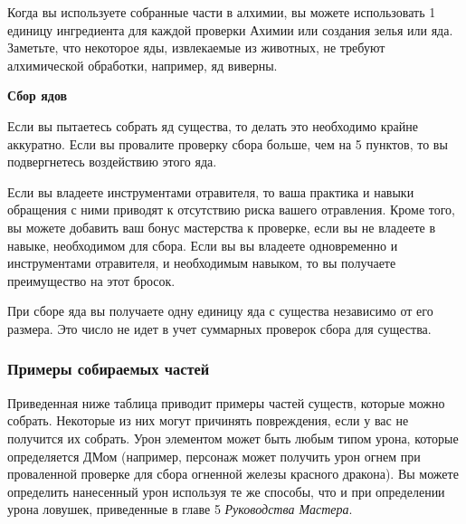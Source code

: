 \documentclass[a4paper, 9pt, twocolumn]{book}
\newenvironment {dndtable}
{
		\bigskip
		\centering
		\begin{tcolorbox}
			[enhanced, 
			sharp corners,
			colback=framecolor, 
			boxrule = 0pt, 
			overlay={
				\begin{tcbinvclipframe}
					\path[fill=black] ([xshift=10pt,yshift=7pt]frame.north west) --
					(frame.north west) --
					(frame.north east) --
					([xshift=-10pt, yshift=7pt]frame.north east) --
					([xshift=-10pt, yshift=2pt]frame.north east) --
					([xshift=10pt,yshift=2pt]frame.north west) -- cycle;
					
					\path[fill=black] ([xshift=10pt,yshift=-7pt]frame.south west) --
					(frame.south west) --
					(frame.south east) --
					([xshift=-10pt, yshift=-7pt]frame.south east) --
					([xshift=-10pt, yshift=-2pt]frame.south east) --
					([xshift=10pt,yshift=-2pt]frame.south west) -- cycle;
				\end{tcbinvclipframe}
			}
			]}
{\end{tcolorbox}}
\begin{document}
	Когда вы используете собранные части в алхимии, вы можете использовать 1 единицу ингредиента для каждой проверки Ахимии или создания зелья или яда. Заметьте, что некоторое яды, извлекаемые из животных, не требуют алхимической обработки, например, яд виверны.
	
	
	
	\begin{dndtable}
		
		{\Large \textbf{Сбор ядов}}
		
		Если вы пытаетесь собрать яд существа, то делать это необходимо крайне аккуратно. Если вы провалите проверку сбора больше, чем на 5 пунктов, то вы подвергнетесь воздействию этого яда.
		
		Если вы владеете инструментами отравителя, то ваша практика и навыки обращения с ними приводят к отсутствию риска вашего отравления. Кроме того, вы можете добавить ваш бонус мастерства к проверке, если вы не владеете в навыке, необходимом для сбора. Если вы вы владеете одновременно и инструментами отравителя, и необходимым навыком, то вы получаете преимущество на этот бросок.
		
		При сборе яда вы получаете одну единицу яда с существа независимо от его размера. Это число не идет в учет суммарных проверок сбора для существа.
		
	\end{dndtable}

	\subsubsection{Примеры собираемых частей}
	
	Приведенная ниже таблица приводит примеры частей существ, которые можно собрать. Некоторые из них могут причинять повреждения, если у вас не получится их собрать. Урон элементом может быть любым типом урона, которые определяется ДМом (например, персонаж может получить урон огнем при проваленной проверке для сбора огненной железы красного дракона). Вы можете определить нанесенный урон используя те же способы, что и при определении урона ловушек, приведенные в главе 5 \textit{Руководства Мастера}.	
	
\end{document}
